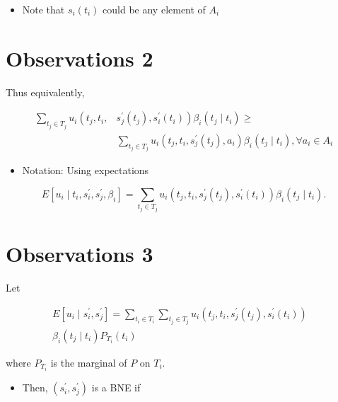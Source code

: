\documentclass[10pt]{article}
\begin{document}
\begin{itemize}
  \item Note that $s_{i}\left(t_{i}\right)$ could be any element of $A_{i}$
\end{itemize}

\section*{Observations 2}
Thus equivalently,

$$
\begin{aligned}
\sum_{t_{j} \in T_{j}} u_{i}\left(t_{j}, t_{i},\right. & \left.s_{j}^{\prime}\left(t_{j}\right), s_{i}^{\prime}\left(t_{i}\right)\right) \beta_{i}\left(t_{j} \mid t_{i}\right) \geq \\
& \sum_{t_{j} \in T_{j}} u_{i}\left(t_{j}, t_{i}, s_{j}^{\prime}\left(t_{j}\right), a_{i}\right) \beta_{i}\left(t_{j} \mid t_{i}\right), \forall a_{i} \in A_{i}
\end{aligned}
$$

\begin{itemize}
  \item Notation: Using expectations
\end{itemize}

$$
E\left[u_{i} \mid t_{i}, s_{i}^{\prime}, s_{j}^{\prime}, \beta_{i}\right]=\sum_{t_{j} \in T_{j}} u_{i}\left(t_{j}, t_{i}, s_{j}^{\prime}\left(t_{j}\right), s_{i}^{\prime}\left(t_{i}\right)\right) \beta_{i}\left(t_{j} \mid t_{i}\right) .
$$

\section*{Observations 3}
Let

$$
\begin{aligned}
E\left[u_{i} \mid s_{i}^{\prime}, s_{j}^{\prime}\right]=\sum_{t_{i} \in T_{i}} \sum_{t_{j} \in T_{j}} u_{i}\left(t_{j}, t_{i}, s_{j}^{\prime}\left(t_{j}\right), s_{i}^{\prime}\left(t_{i}\right)\right) & \\
\beta_{i}\left(t_{j} \mid t_{i}\right) P_{T_{i}}\left(t_{i}\right) &
\end{aligned}
$$

where $P_{T_{i}}$ is the marginal of $P$ on $T_{i}$.

\begin{itemize}
  \item Then, $\left(s_{i}^{\prime}, s_{j}^{\prime}\right)$ is a BNE if
\end{itemize}
\end{document}
